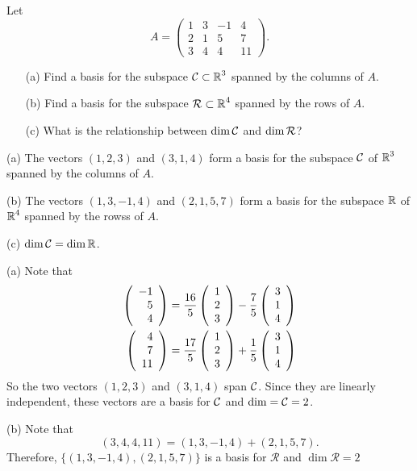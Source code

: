 \documentclass{ximera}
\begin{document}
\begin{exercise} \label{c5.6.2}
Let
\[
A=\left(\begin{array}{rrrr} 1 & 3 & -1 & 4\\ 2& 1 & 5 & 7\\ 3 & 4 & 4 & 11
\end{array}\right).
\]
\begin{itemize}
\item[(a)] Find a basis for the subspace ${\cal C}\subset\mbox{$\Bbb{R}$}^3$ spanned by the
columns of $A$.
\item[(b)] Find a basis for the subspace ${\cal R}\subset\mbox{$\Bbb{R}$}^4$ spanned by the
rows of $A$.
\item[(c)] What is the relationship between $\dim {\cal C}$ and
$\dim {\cal R}$?
\end{itemize}

\begin{solution}

\ans (a) The vectors $(1,2,3)$ and $(3,1,4)$ form a basis for the subspace
	${\cal C}$ of $\mbox{$\Bbb{R}$}^3$ spanned by the columns of $A$.

(b) The vectors $(1,3,-1,4)$ and $(2,1,5,7)$ form a basis for the subspace
	$\mbox{$\Bbb{R}$}$ of $\mbox{$\Bbb{R}$}^4$ spanned by the rowss of $A$.

(c) $\dim {\cal C} = \dim \mbox{$\Bbb{R}$}$.

\soln (a) Note that 
\begin{eqnarray*} 
\left(\begin{array}{r} -1 \\ 5 \\ 4\end{array}\right) = \frac{16}{5}\left(\begin{array}{r} 1 \\ 2 \\ 3\end{array}\right) 
	- \frac{7}{5}\left(\begin{array}{r} 3 \\ 1 \\ 4\end{array}\right) \\ 
\left(\begin{array}{r} 4 \\ 7 \\ 11\end{array}\right) = \frac{17}{5}\left(\begin{array}{r} 1 \\ 2 \\ 3\end{array}\right) 
	+ \frac{1}{5}\left(\begin{array}{r} 3 \\ 1 \\ 4\end{array}\right)
\end{eqnarray*}
So the two vectors $(1, 2, 3)$ and $(3,1,4)$ span ${\cal C}$.  Since they are 
linearly independent, these vectors are a basis for ${\cal C}$ and $\dim ={\cal C}=2$.

(b) Note that 
\[
(3,4,4,11) = (1,3,-1,4) + (2,1,5,7).
\]
Therefore, $\{(1,3,-1,4),(2,1,5,7)\}$ is a basis for $\mathcal{R}$ and 
$\dim \mathcal{R}=2$


\end{solution}
\end{exercise}
\end{document}
